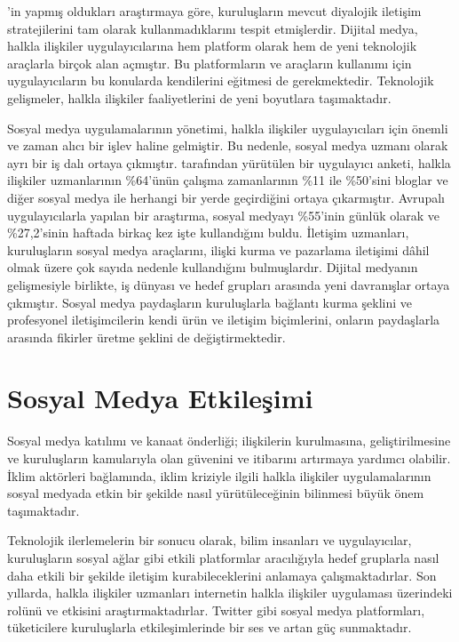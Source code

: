 \documentclass[
]{book}
\begin{document}
\citet{rybalko2010dialogic} 'in yapmış oldukları araştırmaya göre, kuruluşların mevcut diyalojik iletişim stratejilerini tam olarak kullanmadıklarını tespit etmişlerdir. \citep{burnap2015} Dijital medya, halkla ilişkiler uygulayıcılarına hem platform olarak hem de yeni teknolojik araçlarla birçok alan açmıştır. Bu platformların ve araçların kullanımı için uygulayıcıların bu konularda kendilerini eğitmesi de gerekmektedir. Teknolojik gelişmeler, halkla ilişkiler faaliyetlerini de yeni boyutlara taşımaktadır.

Sosyal medya uygulamalarının yönetimi, halkla ilişkiler uygulayıcıları için önemli ve zaman alıcı bir işlev haline gelmiştir. Bu nedenle, sosyal medya uzmanı olarak ayrı bir iş dalı ortaya çıkmıştır. \citet{wright2017tracking} tarafından yürütülen bir uygulayıcı anketi, halkla ilişkiler uzmanlarının \%64'ünün çalışma zamanlarının \%11 ile \%50'sini bloglar ve diğer sosyal medya ile herhangi bir yerde geçirdiğini ortaya çıkarmıştır. Avrupalı uygulayıcılarla yapılan bir araştırma, sosyal medyayı \%55'inin günlük olarak ve \%27,2'sinin haftada birkaç kez işte kullandığını buldu. \citep{moreno2015does} İletişim uzmanları, kuruluşların sosyal medya araçlarını, ilişki kurma \citep{cho2014} ve pazarlama iletişimi \citep{estanyol2012marketing} dâhil olmak üzere çok sayıda nedenle kullandığını bulmuşlardır. Dijital medyanın gelişmesiyle birlikte, iş dünyası ve hedef grupları arasında yeni davranışlar ortaya çıkmıştır. Sosyal medya paydaşların kuruluşlarla bağlantı kurma şeklini ve profesyonel iletişimcilerin kendi ürün ve iletişim biçimlerini, onların paydaşlarla arasında fikirler üretme şeklini de değiştirmektedir. \citep{thelen2021dialogic, young2013thought}

\hypertarget{sosyal-medya-etkileux15fimi}{%
\section{Sosyal Medya Etkileşimi}\label{sosyal-medya-etkileux15fimi}}

Sosyal medya katılımı ve kanaat önderliği; ilişkilerin kurulmasına, geliştirilmesine ve kuruluşların kamularıyla olan güvenini ve itibarını artırmaya yardımcı olabilir. İklim aktörleri bağlamında, iklim kriziyle ilgili halkla ilişkiler uygulamalarının sosyal medyada etkin bir şekilde nasıl yürütüleceğinin bilinmesi büyük önem taşımaktadır.

Teknolojik ilerlemelerin bir sonucu olarak, bilim insanları ve uygulayıcılar, kuruluşların sosyal ağlar gibi etkili platformlar aracılığıyla hedef gruplarla nasıl daha etkili bir şekilde iletişim kurabileceklerini anlamaya çalışmaktadırlar. Son yıllarda, halkla ilişkiler uzmanları internetin halkla ilişkiler uygulaması üzerindeki rolünü ve etkisini araştırmaktadırlar. Twitter gibi sosyal medya platformları, tüketicilere kuruluşlarla etkileşimlerinde bir ses ve artan güç sunmaktadır.
\end{document}
